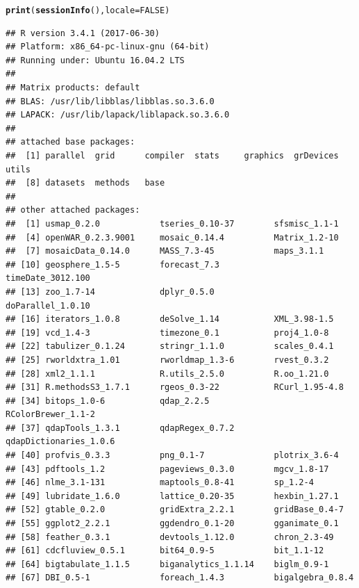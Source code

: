 \documentclass[11pt, a4paper,twoside]{report}\usepackage[]{graphicx}\usepackage[]{color}
\makeatletter
\newcommand{\hlnum}[1]{\textcolor[rgb]{0.686,0.059,0.569}{#1}}%
\newcommand{\hlstd}[1]{\textcolor[rgb]{0.345,0.345,0.345}{#1}}%
\newcommand{\hlkwc}[1]{\textcolor[rgb]{0.333,0.667,0.333}{#1}}%
\newcommand{\hlkwd}[1]{\textcolor[rgb]{0.737,0.353,0.396}{\textbf{#1}}}%
\newenvironment{kframe}{%
 \def\at@end@of@kframe{}%
 \ifinner\ifhmode%
  \def\at@end@of@kframe{\end{minipage}}%
  \begin{minipage}{\columnwidth}%
 \fi\fi%
 \def\FrameCommand##1{\hskip\@totalleftmargin \hskip-\fboxsep
 \colorbox{shadecolor}{##1}\hskip-\fboxsep
     \hskip-\linewidth \hskip-\@totalleftmargin \hskip\columnwidth}%
 \MakeFramed {\advance\hsize-\width
   \@totalleftmargin\z@ \linewidth\hsize
   \@setminipage}}%
 {\par\unskip\endMakeFramed%
 \at@end@of@kframe}
\newenvironment{knitrout}{}{} %
\makeatother
\begin{document}
\begin{knitrout}
\color{fgcolor}\begin{kframe}
\begin{alltt}
\hlkwd{print}\hlstd{(} \hlkwd{sessionInfo}\hlstd{(),} \hlkwc{locale}\hlstd{=}\hlnum{FALSE}\hlstd{)}
\end{alltt}
\begin{verbatim}
## R version 3.4.1 (2017-06-30)
## Platform: x86_64-pc-linux-gnu (64-bit)
## Running under: Ubuntu 16.04.2 LTS
## 
## Matrix products: default
## BLAS: /usr/lib/libblas/libblas.so.3.6.0
## LAPACK: /usr/lib/lapack/liblapack.so.3.6.0
## 
## attached base packages:
##  [1] parallel  grid      compiler  stats     graphics  grDevices utils    
##  [8] datasets  methods   base     
## 
## other attached packages:
##  [1] usmap_0.2.0            tseries_0.10-37        sfsmisc_1.1-1         
##  [4] openWAR_0.2.3.9001     mosaic_0.14.4          Matrix_1.2-10         
##  [7] mosaicData_0.14.0      MASS_7.3-45            maps_3.1.1            
## [10] geosphere_1.5-5        forecast_7.3           timeDate_3012.100     
## [13] zoo_1.7-14             dplyr_0.5.0            doParallel_1.0.10     
## [16] iterators_1.0.8        deSolve_1.14           XML_3.98-1.5          
## [19] vcd_1.4-3              timezone_0.1           proj4_1.0-8           
## [22] tabulizer_0.1.24       stringr_1.1.0          scales_0.4.1          
## [25] rworldxtra_1.01        rworldmap_1.3-6        rvest_0.3.2           
## [28] xml2_1.1.1             R.utils_2.5.0          R.oo_1.21.0           
## [31] R.methodsS3_1.7.1      rgeos_0.3-22           RCurl_1.95-4.8        
## [34] bitops_1.0-6           qdap_2.2.5             RColorBrewer_1.1-2    
## [37] qdapTools_1.3.1        qdapRegex_0.7.2        qdapDictionaries_1.0.6
## [40] profvis_0.3.3          png_0.1-7              plotrix_3.6-4         
## [43] pdftools_1.2           pageviews_0.3.0        mgcv_1.8-17           
## [46] nlme_3.1-131           maptools_0.8-41        sp_1.2-4              
## [49] lubridate_1.6.0        lattice_0.20-35        hexbin_1.27.1         
## [52] gtable_0.2.0           gridExtra_2.2.1        gridBase_0.4-7        
## [55] ggplot2_2.2.1          ggdendro_0.1-20        gganimate_0.1         
## [58] feather_0.3.1          devtools_1.12.0        chron_2.3-49          
## [61] cdcfluview_0.5.1       bit64_0.9-5            bit_1.1-12            
## [64] bigtabulate_1.1.5      biganalytics_1.1.14    biglm_0.9-1           
## [67] DBI_0.5-1              foreach_1.4.3          bigalgebra_0.8.4      

\end{verbatim}
\end{kframe}
\end{knitrout}
\end{document}
